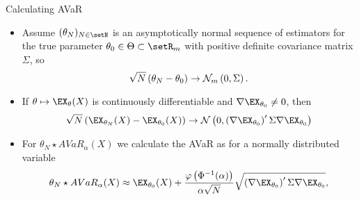 {Calculating AVaR}
\begin{itemize}
\item Assume $(\theta_N)_{N \in \setN}$ is an asymptotically normal sequence of estimators for the true parameter $\theta_0 \in \Theta \subset \setR_m$  with positive definite covariance matrix $\Sigma$, so
$$
\sqrt{N}\left(\theta_N -\theta_0\right) \rightarrow {\cal N}_m \left(0,\Sigma\right).
$$
\item If $\theta \mapsto \EX_\theta(X)$ is continuously differentiable and $\nabla  \EX_{\theta_0} \not =0$, then
$$
\sqrt{N}\left(\EX_{\theta_N}(X)-\EX_{\theta_0}(X)\right) \rightarrow {\cal N}\left(0, \left(\nabla \EX_{\theta_0}\right)' \Sigma \nabla \EX_{\theta_0}\right)
$$
\item For $\theta_N \star AVaR_\alpha(X)$ we calculate the AVaR as for a normally distributed variable
$$
\theta_N \star AVaR_\alpha(X) \approx \EX_{\theta_0}(X) + \frac{\varphi\left(\Phi^{-1}(\alpha)\right)}{\alpha\sqrt{N}} \sqrt{\left(\nabla \EX_{\theta_0}\right)' \Sigma \nabla \EX_{\theta_0}},
$$
\end{itemize}

